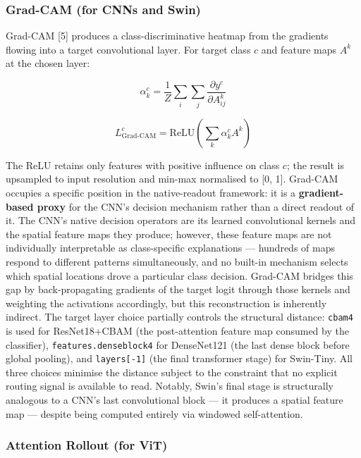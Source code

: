 \documentclass[11pt,a4paper]{article}
\begin{document}
\subsubsection{Grad-CAM (for CNNs and Swin)}

Grad-CAM [5] produces a class-discriminative heatmap from the gradients flowing into a target convolutional layer. For target class $c$ and feature maps $A^k$ at the chosen layer:

\begin{equation}
\alpha_k^c = \frac{1}{Z} \sum_i \sum_j \frac{\partial y^c}{\partial A^k_{ij}}
\tag{8}
\end{equation}

\begin{equation}
L_{\text{Grad-CAM}}^c = \text{ReLU}\!\left(\sum_k \alpha_k^c A^k\right)
\tag{9}
\end{equation}

The ReLU retains only features with positive influence on class $c$; the result is upsampled to input resolution and min-max normalised to [0, 1]. Grad-CAM occupies a specific position in the native-readout framework: it is a \textbf{gradient-based proxy} for the CNN's decision mechanism rather than a direct readout of it. The CNN's native decision operators are its learned convolutional kernels and the spatial feature maps they produce; however, these feature maps are not individually interpretable as class-specific explanations --- hundreds of maps respond to different patterns simultaneously, and no built-in mechanism selects which spatial locations drove a particular class decision. Grad-CAM bridges this gap by back-propagating gradients of the target logit through those kernels and weighting the activations accordingly, but this reconstruction is inherently indirect. The target
layer choice partially controls the structural distance: \texttt{cbam4} is used for ResNet18+CBAM (the post-attention feature map consumed by the classifier), \texttt{features.denseblock4} for DenseNet121 (the last dense block before global pooling), and \texttt{layers[-1]} (the final transformer stage) for Swin-Tiny. All three choices minimise the distance subject to the constraint that no explicit routing signal is available to read. Notably, Swin's final stage is structurally analogous to a CNN's last convolutional block --- it produces a spatial feature map --- despite being computed entirely via windowed self-attention.

\subsubsection{Attention Rollout (for ViT)}
\end{document}
